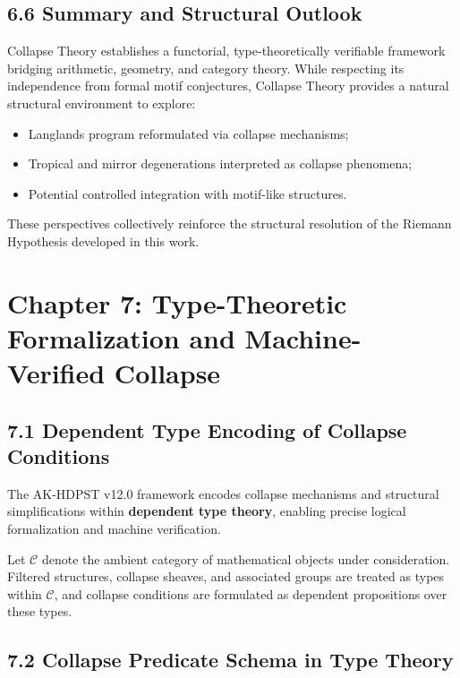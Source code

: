 \documentclass[11pt]{article}
\begin{document}
\subsection*{6.6 Summary and Structural Outlook}

Collapse Theory establishes a functorial, type-theoretically verifiable framework bridging arithmetic, geometry, and category theory. While respecting its independence from formal motif conjectures, Collapse Theory provides a natural structural environment to explore:

\begin{itemize}
    \item Langlands program reformulated via collapse mechanisms;
    \item Tropical and mirror degenerations interpreted as collapse phenomena;
    \item Potential controlled integration with motif-like structures.
\end{itemize}

These perspectives collectively reinforce the structural resolution of the Riemann Hypothesis developed in this work.



\section{Chapter 7: Type-Theoretic Formalization and Machine-Verified Collapse}

\subsection*{7.1 Dependent Type Encoding of Collapse Conditions}

The AK-HDPST v12.0 framework encodes collapse mechanisms and structural simplifications within \textbf{dependent type theory}, enabling precise logical formalization and machine verification.

Let $\mathcal{C}$ denote the ambient category of mathematical objects under consideration. Filtered structures, collapse sheaves, and associated groups are treated as types within $\mathcal{C}$, and collapse conditions are formulated as dependent propositions over these types.

\subsection*{7.2 Collapse Predicate Schema in Type Theory}
\end{document}

